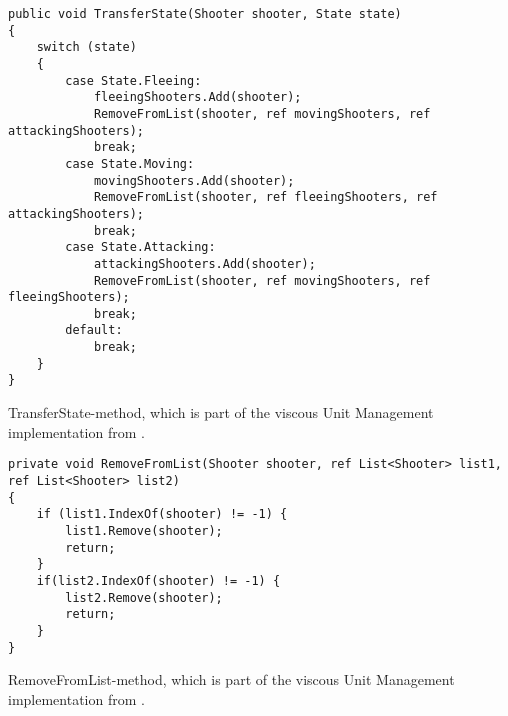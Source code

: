 \begin{listing}
    \begin{verbatim}
public void TransferState(Shooter shooter, State state)
{
    switch (state)
    {
        case State.Fleeing:
            fleeingShooters.Add(shooter);
            RemoveFromList(shooter, ref movingShooters, ref attackingShooters);
            break;
        case State.Moving:
            movingShooters.Add(shooter);
            RemoveFromList(shooter, ref fleeingShooters, ref attackingShooters);
            break;
        case State.Attacking:
            attackingShooters.Add(shooter);
            RemoveFromList(shooter, ref movingShooters, ref fleeingShooters);
            break;
        default:
            break;
    }
}
    \end{verbatim}
    \caption{TransferState-method, which is part of the viscous Unit Management implementation from .}
    \label{lst:csharp:viscous:transfer}
\end{listing}

\begin{listing}
    \begin{verbatim}
private void RemoveFromList(Shooter shooter, ref List<Shooter> list1, ref List<Shooter> list2)
{
    if (list1.IndexOf(shooter) != -1) {
        list1.Remove(shooter);
        return;
    }
    if(list2.IndexOf(shooter) != -1) {
        list2.Remove(shooter);
        return;
    }
}
    \end{verbatim}
    \caption{RemoveFromList-method, which is part of the viscous Unit Management implementation from .}
    \label{lst:csharp:viscous:remove}
\end{listing}
